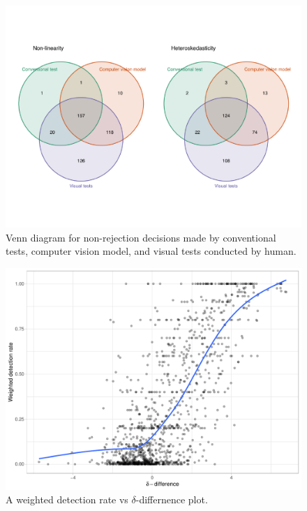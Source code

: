 \documentclass[]{interact}
\theoremstyle{plain}%
\theoremstyle{definition}
\theoremstyle{remark}
\begin{document}
\begin{figure}[!h]

{\centering \includegraphics[width=1\linewidth]{paper_files/figure-latex/venn-1} 

}

\caption{Venn diagram for non-rejection decisions made by conventional tests, computer vision model, and visual tests conducted by human.}\label{fig:venn}
\end{figure}

\begin{figure}[!h]

{\centering \includegraphics[width=1\linewidth]{paper_files/figure-latex/delta-1} 

}

\caption{A weighted detection rate vs $\delta$-differnence plot.}\label{fig:delta}
\end{figure}
\end{document}

